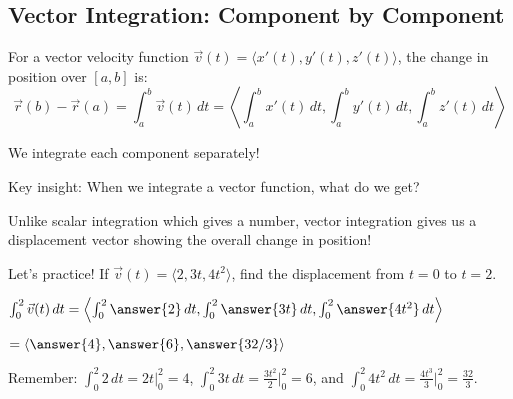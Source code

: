 \documentclass{ximera}
\begin{document}
\subsection*{Vector Integration: Component by Component}

\begin{definition}
For a vector velocity function $\vec{v}(t)=\langle x'(t), y'(t), z'(t)\rangle$, the change in position over $[a,b]$ is:
$$\vec{r}(b)-\vec{r}(a)= \int_a^b \vec{v}(t)\, dt=\left\langle \int_a^b x'(t)\, dt, \int_a^b y'(t)\, dt, \int_a^b z'(t)\, dt\right\rangle$$

We integrate each component separately!
\end{definition}

\begin{problem}
Key insight: When we integrate a vector function, what do we get?

\begin{multipleChoice}
\end{multipleChoice}

\begin{feedback}
Unlike scalar integration which gives a number, vector integration gives us a displacement vector showing the overall change in position!
\end{feedback}
\end{problem}

\begin{problem}
Let's practice! If $\vec{v}(t) = \langle 2, 3t, 4t^2 \rangle$, find the displacement from $t=0$ to $t=2$.

$\int_0^2 \vec{v}(t) \, dt = \left\langle \int_0^2 \answer{2} \, dt, \int_0^2 \answer{3t} \, dt, \int_0^2 \answer{4t^2} \, dt \right\rangle$

$= \langle \answer{4}, \answer{6}, \answer{32/3} \rangle$

\begin{feedback}
Remember: $\int_0^2 2 \, dt = 2t \big|_0^2 = 4$, $\int_0^2 3t \, dt = \frac{3t^2}{2} \big|_0^2 = 6$, and $\int_0^2 4t^2 \, dt = \frac{4t^3}{3} \big|_0^2 = \frac{32}{3}$.
\end{feedback}
\end{problem}
\end{document}
